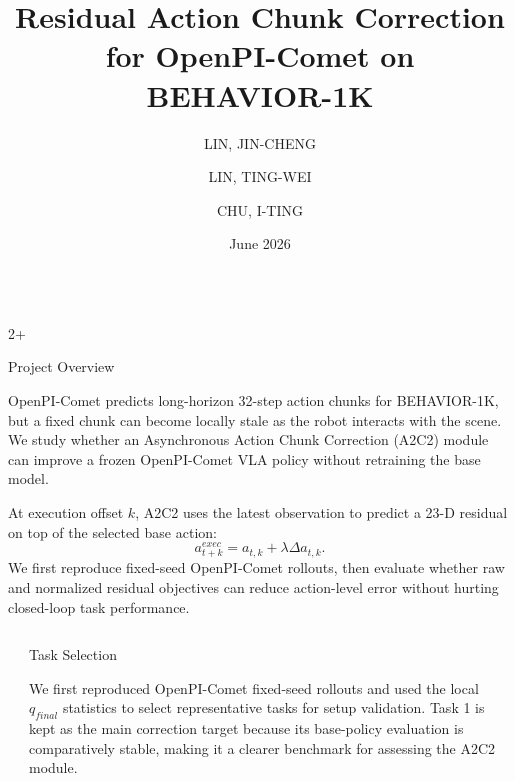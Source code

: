 \documentclass[final]{beamer}
\title{Residual Action Chunk Correction for OpenPI-Comet on BEHAVIOR-1K}
\author{LIN, JIN-CHENG \and LIN, TING-WEI \and CHU, I-TING}
\institute[shortinst]{Deep Learning Final Project}
\date{June 2026}
\newlength{\sepwidth}
\newlength{\colwidth}
\newcommand{\separatorcolumn}{\begin{column}{\sepwidth}\end{column}}
\begin{document}
	
\begin{frame}[t]
	
	\vspace*{-2ex}

	\begin{columns}[t]
	
	\begin{column}{2\colwidth+\sepwidth}
	\begin{block}{Project Overview}
		
		OpenPI-Comet predicts long-horizon 32-step action chunks for BEHAVIOR-1K,
		but a fixed chunk can become locally stale as the robot interacts with the
		scene. We study whether an Asynchronous Action Chunk Correction (A2C2)
		module can improve a frozen OpenPI-Comet VLA policy without retraining the
		base model.
		
		At execution offset $k$, A2C2 uses the latest observation to predict a
		23-D residual on top of the selected base action:
		$$
		a^{exec}_{t+k} = a_{t,k} + \lambda \Delta a_{t,k}.
		$$
		We first reproduce fixed-seed OpenPI-Comet rollouts, then evaluate whether
		raw and normalized residual objectives can reduce action-level error without
		hurting closed-loop task performance.

		
	\end{block}
	\end{column}

	\end{columns}

	\begin{columns}[t]
		\separatorcolumn
		
		\begin{column}{\colwidth}
			
			\begin{exabox}{Task Selection}
				\color{brown!35!black}
				
				We first reproduced OpenPI-Comet fixed-seed rollouts and used the local
				$q_{final}$ statistics to select representative tasks for setup validation.
				Task 1 is kept as the main correction target because its base-policy
				evaluation is comparatively stable, making it a clearer benchmark for
				assessing the A2C2 module.
				

\end{exabox}
\end{column}
\end{columns}
\end{frame}
\end{document}
